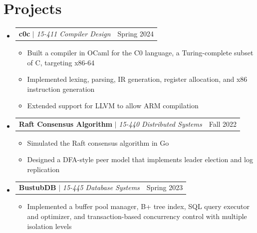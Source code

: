 \documentclass[letterpaper,11pt]{article}
\makeatletter
\newcommand{\resumeItem}[1]{
  \item\small{
    {#1 \vspace{-2pt}}
  }
}
\newcommand{\resumeProjectHeading}[2]{
    \item
    \begin{tabular*}{0.97\textwidth}{l@{\extracolsep{\fill}}r}
      \small#1 & #2 \\
    \end{tabular*}\vspace{-7pt}
}
\newcommand{\resumeSubHeadingListStart}{\begin{itemize}[leftmargin=0.15in, label={}]}
\newcommand{\resumeSubHeadingListEnd}{\end{itemize}}
\newcommand{\resumeItemListStart}{\begin{itemize}}
\newcommand{\resumeItemListEnd}{\end{itemize}\vspace{-5pt}}
\makeatother
\begin{document}
\section{Projects}
    \resumeSubHeadingListStart
      \resumeProjectHeading
          {\textbf{c0c} $|$ \emph{15-411 Compiler Design}}{Spring 2024}
          \resumeItemListStart
            \resumeItem{Built a compiler in OCaml for the C0 language, a Turing-complete subset of C, targeting x86-64}
            \resumeItem{Implemented lexing, parsing, IR generation, register allocation, and x86 instruction generation}
            \resumeItem{Extended support for LLVM to allow ARM compilation}
          \resumeItemListEnd
          \resumeProjectHeading
          {\textbf{Raft Consensus Algorithm} $|$ \emph{15-440 Distributed Systems}}{Fall 2022}
          \resumeItemListStart
          \resumeItem{Simulated the Raft consensus algorithm in Go}
          \resumeItem{Designed a DFA-style peer model that implements leader election and log replication}
          \resumeItemListEnd
      \resumeProjectHeading
          {\textbf{BustubDB} $|$ \emph{15-445 Database Systems}}{Spring 2023}
          \resumeItemListStart
            \resumeItem{Implemented a buffer pool manager, B+ tree index, SQL query executor and optimizer, and transaction-based concurrency control with multiple isolation levels}
          \resumeItemListEnd
    \resumeSubHeadingListEnd
\end{document}
